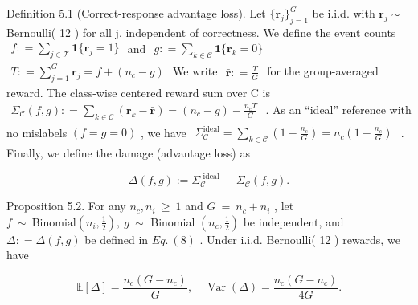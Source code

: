\documentclass[
  10
]{article}
\begin{document}
Definition 5.1 (Correct-response advantage loss). Let
\(\{ \mathbf { r } _ { j } \} _ { j = 1 } ^ { G }\) be i.i.d. with
\(\mathbf { r } _ { j } \sim\) Bernoulli( 12 ) for all j, independent of
correctness. We define the event counts
\(\begin{array} { r } { f : = \sum _ { j \in \mathcal { T } } \mathbf { 1 } \{ \mathbf { r } _ { j } = 1 \} } \end{array}\)
and
\(\begin{array} { r } { g : = \sum _ { k \in \mathcal { C } } \mathbf { 1 } \{ \mathbf { r } _ { k } = 0 \} } \end{array}\)
\(\begin{array} { r } { T : = \sum _ { j = 1 } ^ { G } \mathbf { r } _ { j } = f + ( n _ { c } - g ) } \end{array}\)
We write
\(\begin{array} { r } { \bar { \mathbf { r } } : = \frac { T } { G } } \end{array}\)
for the group-averaged reward. The class-wise centered reward sum over C
is
\(\begin{array} { r } { \Sigma _ { \mathcal { C } } ( f , g ) : = \sum _ { k \in \mathcal { C } } ( \mathbf { r } _ { k } - \bar { \mathbf { r } } ) = ( n _ { c } - g ) - \frac { n _ { c } T } { G } } \end{array}\)
. As an ``ideal'' reference with no mislabels \(( f = g = 0 )\) , we
have
\(\begin{array} { r } { \Sigma _ { \mathcal { C } } ^ { \mathrm { i d e a l } } = \sum _ { k \in \mathcal { C } } ( 1 - \frac { n _ { c } } { G } ) = n _ { c } ( 1 - \frac { n _ { c } } { G } ) } \end{array}\)
. Finally, we define the damage (advantage loss) as

\[
\Delta (f, g) := \Sigma_ {\mathcal {C}} ^ {\text { ideal }} - \Sigma_ {\mathcal {C}} (f, g). \tag {8}
\]

Proposition 5.2. For any \(n _ { c } , n _ { i } ~ \ge ~ 1\) and
\(G ~ = ~ n _ { c } + n _ { i }\) , let
\(f ~ \sim ~ \mathrm { B i n o m i a l } ( n _ { i } , { \frac { 1 } { 2 } } ) , ~ g ~ \sim\)
Binomial \(( n _ { c } , \textstyle \frac { 1 } { 2 } )\) be
independent, and \(\Delta : = \Delta ( f , g )\) be defined in
\(E q . \ ( 8 )\) . Under i.i.d. Bernoulli( 12 ) rewards, we have

\[
\mathbb {E} [ \Delta ] = \frac {n _ {c} (G - n _ {c})}{G}, \quad \operatorname{Var} (\Delta) = \frac {n _ {c} (G - n _ {c})}{4 G}. \tag {9}
\]
\end{document}
